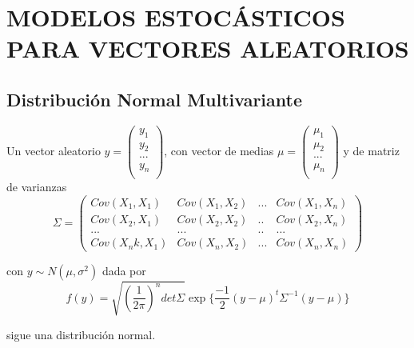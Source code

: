 \chapter{MODELOS ESTOCÁSTICOS PARA VECTORES ALEATORIOS}

\section{Distribución Normal Multivariante}
Un vector aleatorio 
$y = 
\begin{pmatrix}
y_1 \\
y_2 \\
... \\
y_n \\
\end{pmatrix}
$,  con vector de medias 
$ \mu = 
\begin{pmatrix}
\mu_1 \\
\mu_2 \\
... \\
\mu_n \\
\end{pmatrix}
$
y de matriz de varianzas 
$$ \Sigma = 
\begin{pmatrix}
Cov(X_1, X_1) & Cov(X_1,X_2) & ...  & Cov(X_1,X_n)  \\
Cov(X_2, X_1) & Cov(X_2,X_2) & ..  & Cov(X_2,X_n) \\
... & ... & ..   & ...\\
Cov(X_nk, X_1) & Cov(X_n,X_2) &...    & Cov(X_n,X_n)
\end{pmatrix}
$$ 

con  $y \sim N(\mu, \sigma^2)$  dada por 
$$
f(y) = \sqrt{(\frac{1}{2 \pi})^n det\Sigma}  \exp{\{ \frac{-1}{2} (y - \mu)^t \Sigma^{-1} (y - \mu) \}}
$$


sigue una distribución normal. 

